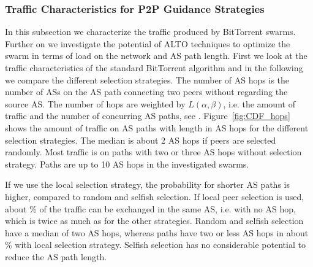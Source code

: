 \subsubsection{Traffic Characteristics for P2P Guidance Strategies}
In this subsection we characterize the traffic produced by BitTorrent swarms. Further on we investigate the potential of ALTO techniques to optimize the swarm in terms of load on the network and AS path length.
First we look at the traffic characteristics of the standard BitTorrent algorithm and in the following we compare the different selection strategies.
The number of AS hops is the number of ASs on the AS path connecting two peers without regarding the source AS. The number of hops are weighted by $L(\alpha,\beta)$, i.e. the amount of traffic and the number of concurring AS paths, see . Figure~\ref{fig:CDF_hops} shows the amount of traffic on AS paths with length in AS hops for the different selection strategies. The median is about 2 AS hops if peers are selected randomly. Most traffic is on paths with two or three AS hops without selection strategy. Paths are up to 10 AS hops in the investigated swarms.




If we use the local selection strategy, the probability for shorter AS paths is higher, compared to random and selfish selection. If local peer selection is used, about \unit[20]{\%} of the traffic can be exchanged in the same AS, i.e. with no AS hop, which is twice as much as for the other strategies. Random and selfish selection have a median of two AS hops, whereas paths have two or less AS hops in about \unit[80]{\%} with local selection strategy. Selfish selection has no considerable potential to reduce the AS path length.

